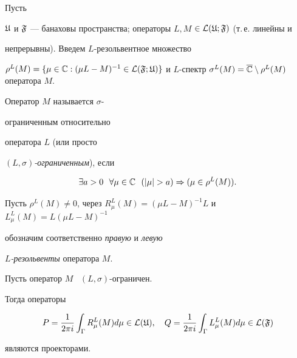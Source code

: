 Пусть


${\frak U}$ и ${\frak F}$ --- банаховы пространства; операторы $L,


M$ $\in {\cal L} ({\frak U}; {\frak F})$ (т.\,е. линейны и


непрерывны). Введем $L$-резольвентное множество


$\rho^L(M)=\{\mu\in{\Bbb C}: (\mu L - M)^{-1}\in{\cal L}({\frak


F}; {\frak U})\}$ и $L$-спектр $\sigma^L(M)=\overline{\Bbb


C}\setminus\rho^L(M)$ оператора $M$.





\begin{defns}


Оператор $M$ называется $\sigma$-{\it


ограниченным относительно} оператора $L$ (или просто


$(L,\sigma)${\it -ограниченным}), если


$$


\exists a>0 \ \  


\forall\mu\in {\Bbb C} \ \ (|\mu |>a)\Rightarrow


(\mu\in\rho^L(M)).


$$


\end{defns}





Пусть $\rho^L(M) \ne0$, через $R_{\mu }^L(M)


=(\mu L-M)^{-1}L$ и $L_{\mu }^L(M)=L(\mu L-M)^{-1}$


обозначим соответственно {\it правую} и {\it левую}


$L${\it-резольвенты} оператора $M$.





\begin{lems}


Пусть оператор $M$ \ $(L,\sigma)$-ограничен.


Тогда операторы


\begin{equation}


P = \frac{1}{2\pi


i}\int_{\Gamma }R_{\mu }^L(M)d\mu \in {\cal L}({\frak U}),


\quad Q = \frac{1}{2\pi i}\int_{\Gamma }L_{\mu }^L(M)d\mu


\in {\cal L}({\frak F})


\end{equation}


являются проекторами.


\end{lems}





